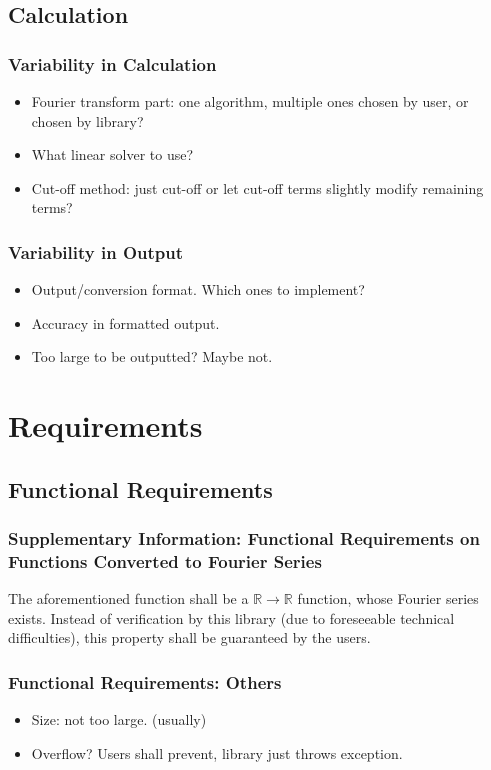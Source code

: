 \documentclass{beamer}
\begin{document}
		\subsection{Calculation}
		\begin{frame}
			\frametitle{Variability in Calculation}
			\begin{itemize}
				\item Fourier transform part: one algorithm, multiple ones chosen by user, or chosen by library?
				\item What linear solver to use?
				\item Cut-off method: just cut-off or let cut-off terms slightly modify remaining terms?
			\end{itemize}
		\end{frame}
	
		\begin{frame}
			\frametitle{Variability in Output}
			\begin{itemize}
				\item Output/conversion format. Which ones to implement?
				\item Accuracy in formatted output.
				\item Too large to be outputted? Maybe not.
			\end{itemize}
		\end{frame}
	
	\section{Requirements}
	\subsection{Functional Requirements}
	\begin{frame}
	\frametitle{Supplementary Information: Functional Requirements on Functions Converted to Fourier Series}
	The aforementioned function shall be a $\mathbb{R}\rightarrow\mathbb{R}$ function, whose Fourier series exists. Instead of verification by this library (due to foreseeable technical difficulties), this property shall be guaranteed by the users. 
	\end{frame}
	
	
	\begin{frame}
		\frametitle{Functional Requirements: Others}
		\begin{itemize}
			\item Size: not too large. (usually)
			\item Overflow? Users shall prevent, library just throws exception.
		\end{itemize}
	\end{frame}
	
\end{document}
